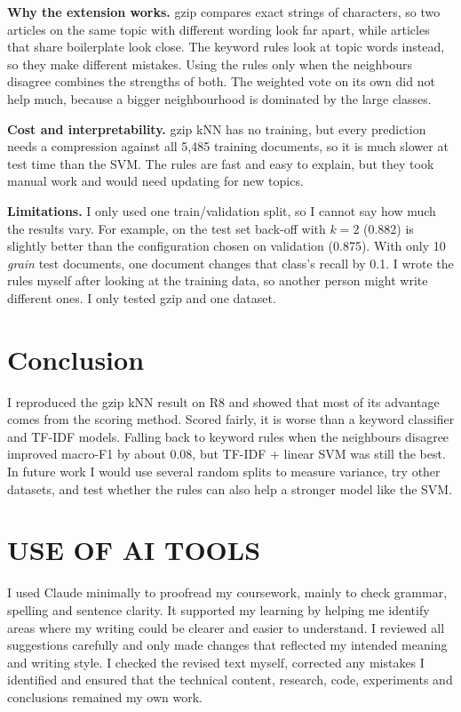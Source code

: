 \documentclass{COMPXXXX}
\begin{document}
\textbf{Why the extension works.} gzip compares exact strings of characters, so two articles on the same topic with different wording look far apart, while articles that share boilerplate look close. The keyword rules look at topic words instead, so they make different mistakes. Using the rules only when the neighbours disagree combines the strengths of both. The weighted vote on its own did not help much, because a bigger neighbourhood is dominated by the large classes.

\textbf{Cost and interpretability.} gzip kNN has no training, but every prediction needs a compression against all 5,485 training documents, so it is much slower at test time than the SVM. The rules are fast and easy to explain, but they took manual work and would need updating for new topics.

\textbf{Limitations.} I only used one train/validation split, so I cannot say how much the results vary. For example, on the test set back-off with $k{=}2$ (0.882) is slightly better than the configuration chosen on validation (0.875). With only 10 \emph{grain} test documents, one document changes that class's recall by 0.1. I wrote the rules myself after looking at the training data, so another person might write different ones. I only tested gzip and one dataset.

\section{Conclusion}
I reproduced the gzip kNN result on R8 and showed that most of its advantage comes from the scoring method. Scored fairly, it is worse than a keyword classifier and TF-IDF models. Falling back to keyword rules when the neighbours disagree improved macro-F1 by about 0.08, but TF-IDF + linear SVM was still the best. In future work I would use several random splits to measure variance, try other datasets, and test whether the rules can also help a stronger model like the SVM.

\section*{USE OF AI TOOLS}
I used Claude minimally to proofread my coursework, mainly to
check grammar, spelling and sentence clarity. It supported my
learning by helping me identify areas where my writing could be
clearer and easier to understand. I reviewed all suggestions
carefully and only made changes that reflected my intended
meaning and writing style. I checked the revised text myself,
corrected any mistakes I identified and ensured that the
technical content, research, code, experiments and
conclusions remained my own work.

\end{document}
